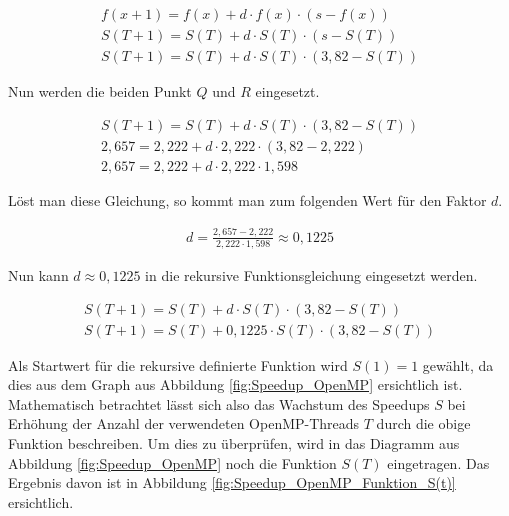 \begin{description}
						\begin{align*}
							f(x + 1) = f(x) + d \cdot f(x) \cdot (s - f(x))\\
							S(T + 1) = S(T) + d \cdot S(T) \cdot (s - S(T))\\
							S(T + 1) = S(T) + d \cdot S(T) \cdot (3,82 - S(T))
						\end{align*}
						
						Nun werden die beiden Punkt $Q$ und $R$ eingesetzt.
						
						\begin{align*}
							S(T + 1) = S(T) + d \cdot S(T) \cdot (3,82 - S(T))\\
							2,657 = 2,222 + d \cdot 2,222 \cdot (3,82 - 2,222)\\
							2,657 = 2,222 + d \cdot 2,222 \cdot 1,598
						\end{align*}
						
						Löst man diese Gleichung, so kommt man zum folgenden Wert für den Faktor $d$.
						
						\begin{align*}
							d = \frac{2,657 - 2,222}{2,222 \cdot 1,598} \approx 0,1225
						\end{align*}
						
						Nun kann $d\approx 0,1225$ in die rekursive Funktionsgleichung eingesetzt werden.
						
						\begin{align*}
							S(T + 1) = S(T) + d \cdot S(T) \cdot (3,82 - S(T))\\
							S(T + 1) = S(T) + 0,1225 \cdot S(T) \cdot (3,82 - S(T))
						\end{align*}
						
						Als Startwert für die rekursive definierte Funktion wird $S(1) = 1$ gewählt, da dies aus dem Graph aus Abbildung \ref{fig:Speedup_OpenMP} ersichtlich ist.\\						
						Mathematisch betrachtet lässt sich also das Wachstum des Speedups $S$ bei Erhöhung der Anzahl der verwendeten OpenMP-Threads $T$ durch die obige Funktion beschreiben. Um dies zu überprüfen, wird in das Diagramm aus Abbildung \ref{fig:Speedup_OpenMP} noch die Funktion $S(T)$ eingetragen. Das Ergebnis davon ist in Abbildung \ref{fig:Speedup_OpenMP_Funktion_S(t)} ersichtlich.
					

\end{description}
